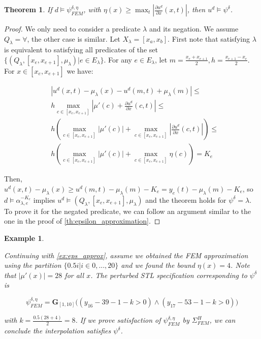 \documentclass[letterpaper, 10 pt, conference]{ieeeconf/ieeeconf}
\newtheorem{theorem}{Theorem}
\newtheorem{example}{Example}
\newcommand{\Always}{\mathbf{G}}
\begin{document}
\begin{theorem}
\label{th:eta_approximation}
    If $d \models \psi^{\delta, \eta}_{FEM}$, with $\eta(x) \geq \max_t |\frac{\partial
    u^d}{\partial x}(x, t)|$, then $u^d \models \psi^\delta$.
\end{theorem}
\begin{proof}
    We only need to consider a predicate $\lambda$ and its negation. We assume
    $Q_\lambda = \forall$, the other case is similar. Let $X_\lambda = [x_a,
    x_b]$. First note that satisfying $\lambda$ is equivalent to satisfying all
    predicates of the set $\{(Q_\lambda, [x_e, x_{e+1}], \mu_\lambda) | e \in
    E_\lambda\}$. For any $e \in E_\lambda$, let $m = \frac{x_e + x_{e+1}}{2}, 
    h = \frac{x_{e+1} - x_{e}}{2}$. 
    For $x \in [x_e, x_{e+1}]$ we have:

    \begin{equation}
    \begin{aligned}
        &|u^d(x, t) - \mu_\lambda(x) - u^d(m, t) + \mu_\lambda(m)| \leq \\
        &h \max_{c \in [x_e, x_{e+1}]} 
        |\mu'(c) + \frac{\partial u^d}{\partial x}(c, t)|
        \leq \\
        &h \left (  
        \max_{c \in [x_e, x_{e+1}]} |\mu'(c)| +
        \max_{c \in [x_e, x_{e+1}]} |\frac{\partial u^d}{\partial x}(c, t)|
        \right ) \leq \\
        &h \left (  
        \max_{c \in [x_e, x_{e+1}]} |\mu'(c)| +
        \max_{c \in [x_e, x_{e+1}]} \eta(c)
        \right )  = K_e
    \end{aligned}
    \end{equation}

    Then, $u^d(x, t) - \mu_\lambda(x) \geq u^d(m, t) - \mu_\lambda(m) - K_e =
    y_e(t) - \mu_\lambda(m) - K_e$, so $d \models \alpha^{-K_e}_{\lambda, e}$
    implies $u^d \models (Q_\lambda, [x_e, x_{e+1}], \mu_\lambda)$ and the
    theorem holds for $\psi^\delta = \lambda$. To prove it for the negated
    predicate, we can follow an argument similar to the one in the proof of
    \cref{th:epsilon_approximation}.
\end{proof}

\begin{example}
    \label{ex:eta_approx}

    Continuing with \cref{ex:eps_approx}, assume we obtained the FEM
    approximation using the partition $\{0.5 i | i \in 0,...,20\}$ and we found the
    bound $\eta(x) = 4$. Note that $|\mu'(x)| = 28$ for all $x$. The perturbed STL
    specification corresponding to $\psi^\delta$ is

    \begin{equation}
        \psi^{\delta, \eta}_{FEM} = \Always_{[1,10]} \bigl(
            (y_{16} - 39 - 1 - k > 0) \land (y_{17} - 53 - 1 - k > 0)
        \bigr)
    \end{equation}

    with $k = \frac{0.5 (28 + 4)}{2} = 8$. If we prove satisfaction of $\psi^{\delta,
    \eta}_{FEM}$ by $\Sigma^H_{FEM}$, we can conclude the interpolation satisfies
    $\psi^\delta$.
    
\end{example}
\end{document}

